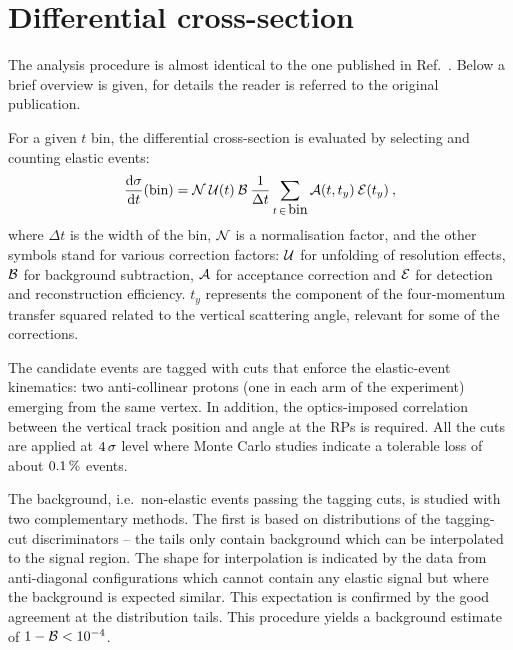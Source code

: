 \documentclass[doublecol]{epl/epl2}
\def\d{{\rm d}}
\def\un#1{\,{\rm #1}}
\def\text#1{\hbox{#1}}
\begin{document}
\section{Differential cross-section}
\label{s:dsdt}

The analysis procedure is almost identical to the one published in Ref.~\cite{totem-8tev-90m}. Below a brief overview is given, for details the reader is referred to the original publication.

For a given $t$ bin, the differential cross-section is evaluated by selecting and counting elastic events:
\begin{equation}
	{\d\sigma\over \d t}(\hbox{bin}) =
		{\cal N}\: {\cal U}(t)\: {\cal B} \: 
		\frac{1}{\Delta t}
                \sum\limits_{t\, \in\, \text{bin}} {\cal A}(t, t_y)\: {\cal E}(t_y) \: ,
\end{equation}
where $\Delta t$ is the width of the bin, ${\cal N}$ is a normalisation factor, 
and the other symbols stand for various correction factors:
${\cal U}$ for unfolding of resolution effects, ${\cal B}$ for background subtraction, ${\cal A}$ for acceptance correction and ${\cal E}$ for detection and reconstruction efficiency. $t_y$ represents the component of the four-momentum transfer squared related to the vertical scattering angle, relevant for some of the corrections.

The candidate events are tagged with cuts that enforce the elastic-event kinematics: two anti-collinear protons (one in each arm of the experiment) emerging from the same vertex. In addition, the optics-imposed correlation between the vertical track position and angle at the RPs is required. All the cuts are applied at $4\un{\sigma}$ level where Monte Carlo studies indicate a tolerable loss of about $0.1\un{\%}$ events.

The background, i.e.~non-elastic events passing the tagging cuts, is studied with two complementary methods. The first is based on distributions of the tagging-cut discriminators -- the tails only contain background which can be interpolated to the signal region. The shape for interpolation is indicated by the data from anti-diagonal configurations which cannot contain any elastic signal but where the background is expected similar. This expectation is confirmed by the good agreement at the distribution tails. This procedure yields a background estimate of $1 - {\cal B} < 10^{-4}$.
\end{document}
